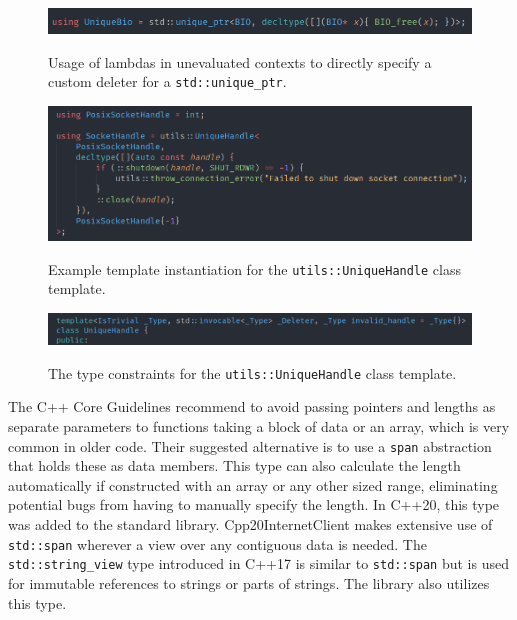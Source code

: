 \documentclass[12pt, a4paper]{article}
\begin{document}
\begin{figure}[ht]
	\centering
	\caption{Usage of lambdas in unevaluated contexts to directly specify a custom deleter for a \texttt{std::unique\_ptr}.}
	\includegraphics[width=\textwidth]{unevaluated_lambdas_unique_ptr}
	\label{fig:unevaluated_lambdas_unique_ptr}
\end{figure}

\begin{figure}[ht]
	\centering
	\caption{Example template instantiation for the \texttt{utils::UniqueHandle} class template.}
	\includegraphics[width=\textwidth]{unique_handle_example}
	\label{fig:unique_handle_example}
\end{figure}

\begin{figure}[ht]
	\centering
	\caption{The type constraints for the \texttt{utils::UniqueHandle} class template.}
	\includegraphics[width=\textwidth]{unique_handle_constraints}
	\label{fig:unique_handle_constraints}
\end{figure}

The C++ Core Guidelines \parencite{CppCoreGuidelines} recommend to avoid passing pointers and lengths as separate parameters to functions taking a block of data or an array, which is very common in older code. Their suggested alternative is to use a \texttt{span} abstraction that holds these as data members. This type can also calculate the length automatically if constructed with an array or any other sized range, eliminating potential bugs from having to manually specify the length. In C++20, this type was added to the standard library. Cpp20InternetClient makes extensive use of \texttt{std::span} wherever a view over any contiguous data is needed. The \texttt{std::string\_view} type introduced in C++17 is similar to \texttt{std::span} but is used for immutable references to strings or parts of strings. The library also utilizes this type.
\end{document}
